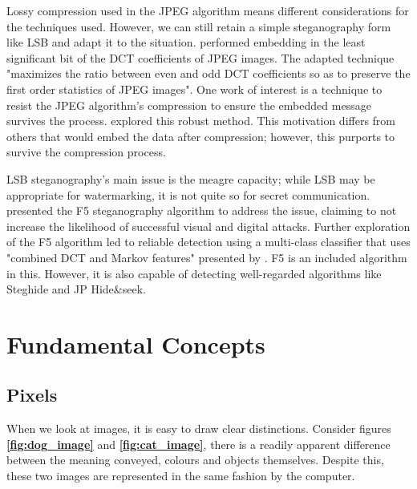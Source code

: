 \documentclass{l4proj}
\begin{document}
Lossy compression used in the JPEG algorithm means different considerations for the techniques used. However, we can still retain a simple steganography form like LSB and adapt it to the situation. \citet{Morsy} performed embedding in the least significant bit of the DCT coefficients of JPEG images. The adapted technique "maximizes the ratio between even and odd DCT coefficients so as to preserve the first order statistics of JPEG images"\citep{Morsy}. One work of interest is a technique to resist the JPEG algorithm's compression to ensure the embedded message survives the process. \citet{doi:10.1080/02564602.2018.1476192} explored this robust method. This motivation differs from others that would embed the data after compression; however, this purports to survive the compression process.

LSB steganography's main issue is the meagre capacity; while LSB may be appropriate for watermarking, it is not quite so for secret communication. \citet{westfeld2001f5}  presented the F5 steganography algorithm to address the issue, claiming to not increase the likelihood of successful visual and digital attacks. Further exploration of the F5 algorithm led to reliable detection using a multi-class classifier that uses "combined DCT and Markov features" presented by \citet{10.1117/12.696774}. F5 is an included algorithm in this. However, it is also capable of detecting well-regarded algorithms like Steghide and JP Hide&seek.

\section{Fundamental Concepts}

\subsection{Pixels}

When we look at images, it is easy to draw clear distinctions. Consider figures \textbf{\ref{fig:dog_image}} and \textbf{\ref{fig:cat_image}}, there is a readily apparent difference between the meaning conveyed, colours and objects themselves. Despite this, these two images are represented in the same fashion by the computer.
\end{document}
